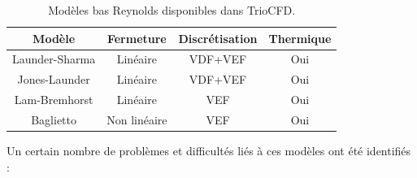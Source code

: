 \begin{table}[!ht]
\begin{center}
\small
\begin{tabular}{|cccc|}
\hline
Mod\`ele	& Fermeture & Discr\'etisation & Thermique\\
\hline
Launder-Sharma & Lin\'eaire & VDF+VEF & Oui\\
Jones-Launder & Lin\'eaire & VDF+VEF & Oui\\
Lam-Bremhorst & Lin\'eaire & VEF & Oui\\
Baglietto & Non lin\'eaire & VEF & Oui\\
\hline
\end{tabular}
\end{center}
\caption{Mod\`eles bas Reynolds disponibles dans TrioCFD.}
\label{Tab=Mod\`eles_bas_Reynolds}
\end{table}

Un certain nombre de probl\`emes et difficult\'es li\'es \`a ces mod\`eles ont \'et\'e identifi\'es :

